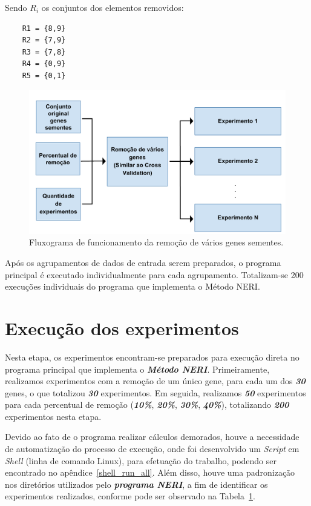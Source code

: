 Sendo $R_i$ os conjuntos dos elementos removidos:

\begin{lstlisting}
    R1 = {8,9}
    R2 = {7,9}
    R3 = {7,8}
    R4 = {0,9}
    R5 = {0,1} 
\end{lstlisting}

\begin{figure}[ht!]
\centering
\includegraphics[width=\textwidth]{Images/flows/cvv_explanation.png}
\caption {Fluxograma de funcionamento da remoção de vários genes sementes.
\label{cvv_explanation}}
\end{figure}
%


Após os agrupamentos de dados de entrada serem preparados, o programa principal é executado individualmente para cada agrupamento. Totalizam-se 200 execuções individuais do programa que implementa o Método NERI.

\section{Execução dos experimentos}

%
% 
Nesta etapa, os experimentos encontram-se preparados para execução direta no programa principal que implementa o \textsl{\textbf{Método NERI}}.
%
Primeiramente, realizamos experimentos com a remoção de um único gene, para cada um dos \textsl{\textbf{30}} genes, o que totalizou \textsl{\textbf{30}} experimentos.
%
Em seguida, realizamos \textsl{\textbf{50}} experimentos para cada percentual de remoção (\textsl{\textbf{10\%}}, \textsl{\textbf{20\%}}, \textsl{\textbf{30\%}}, \textsl{\textbf{40\%}}), totalizando \textsl{\textbf{200}} experimentos nesta etapa.

%
Devido ao fato de o programa realizar cálculos demorados, houve a necessidade de automatização do processo de execução, onde foi desenvolvido um \textsl{Script} em \textsl{Shell} (linha de comando Linux), para efetuação do trabalho, podendo ser encontrado no apêndice~\ref{shell_run_all}.
Além disso, houve uma padronização nos diretórios utilizados pelo \textsl{\textbf{programa NERI}}, a fim de identificar os experimentos realizados, conforme pode ser observado na Tabela~\ref{}.


